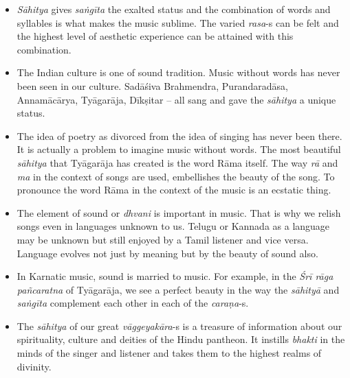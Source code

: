 \begin{itemize}
\itemsep=0pt
\item \textit{Sāhitya} gives \textit{saṅgīta} the exalted status and the combination of words and syllables is what makes the music sublime. The varied \textit{rasa}-s can be felt and the highest level of aesthetic experience can be attained with this combination.

 \item The Indian culture is one of sound tradition. Music without words has never been seen in our culture. Sadāśiva Brahmendra, Purandaradāsa, Annamācārya, Tyāgarāja, Dīkṣitar – all sang and gave the \textit{sāhitya} a unique status. 

 \item The idea of poetry as divorced from the idea of singing has never been there. It is actually a problem to imagine music without words. The most beautiful \textit{sāhitya} that Tyāgarāja has created is the word Rāma itself. The way \textit{rā} and \textit{ma} in the context of songs are used, embellishes the beauty of the song. To pronounce the word Rāma in the context of the music is an ecstatic thing.

 \item The element of sound or \textit{dhvani} is important in music. That is why we relish songs even in languages unknown to us. Telugu or Kannada as a language may be unknown but still enjoyed by a Tamil listener and vice versa. Language evolves not just by meaning but by the beauty of sound also. 

 \item In Karnatic music, sound is married to music. For example, in the \textit{Śrī rāga pañcaratna} of Tyāgarāja, we see a perfect beauty in the way the \textit{sāhityā} and \textit{saṅgīta} complement each other in each of the \textit{caraṇa}-s.

 \item The \textit{sāhitya} of our great \textit{vāggeyakāra}-s is a treasure of information about our spirituality, culture and deities of the Hindu pantheon. It instills \textit{bhakti} in the minds of the singer and listener and takes them to the highest realms of divinity.

\end{itemize}

